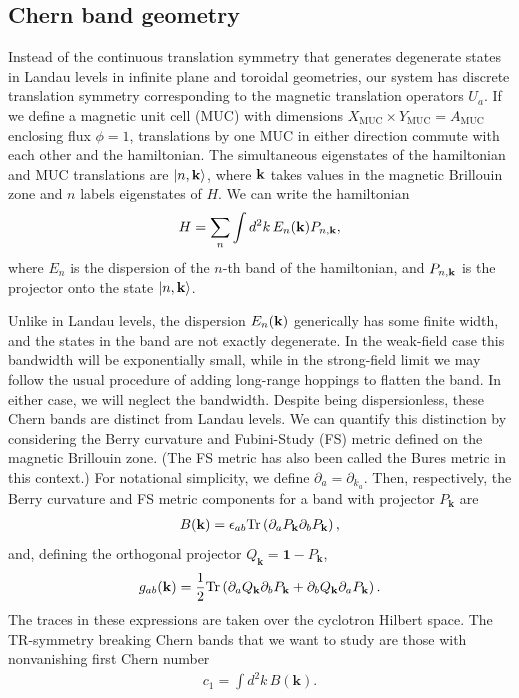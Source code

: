 \documentclass[aps,prb,twocolumn,letterpaper,twoside,nobalancelastpage,groupedaddress,amsmath,amssymb,floatfix,citeautoscript]{revtex4-1}
\begin{document}
\subsection{Chern band geometry}
Instead of the continuous translation symmetry that generates degenerate states in Landau levels in infinite plane and toroidal geometries, our system has discrete translation symmetry corresponding to the magnetic translation operators $U_a$. If we define a magnetic unit cell (MUC) with dimensions $X_{\text{MUC}} \times Y_{\text{MUC}} = A_{\text{MUC}}$ enclosing flux $\phi=1$, translations by one MUC in either direction commute with each other and the hamiltonian. The simultaneous eigenstates of the hamiltonian and MUC translations are $\ket{n,{\bf k}}$, where ${\bf k}$ takes values in the magnetic Brillouin zone and $n$ labels eigenstates of $H$. We can write the hamiltonian 
\begin{align}
\label{band-projector-ham}
H = \sum_{n}\int d^2k\, E_{n}({\bf k}) P_{n,{\bf k}},
\end{align}
where $E_n$ is the dispersion of the $n$-th band of the hamiltonian, and $P_{n,{\bf k}}$ is the projector onto the state $\ket{n,{\bf k}}$.

Unlike in Landau levels, the dispersion $E_{n}({\bf k})$ generically has some finite width, and the states in the band are not exactly degenerate. In the weak-field case this bandwidth will be exponentially small\cite{Harper:2014vi}, while in the strong-field limit we may follow the usual procedure of adding long-range hoppings to flatten the band. \cite{Bergholtz:2013ue,parameswaran_fractional_2013} In either case, we will neglect the bandwidth. Despite being dispersionless, these Chern bands are distinct from Landau levels. We can quantify this distinction by considering the Berry curvature and Fubini-Study (FS) metric defined on the magnetic Brillouin zone\cite{parameswaran_fractional_2013,roy_band_2014,Claassen2015}. (The FS metric has also been called the Bures metric in this context.\cite{palumbo_momentum-space_2017}) For notational simplicity, we define $\partial_a = \partial_{k_a}$. Then, respectively, the Berry curvature and FS metric components for a band with projector $P_{\mathbf{k}}$ are
\begin{align}
B({\bf k}) = \epsilon_{ab}\text{Tr}\left(\partial_{a}P_{\mathbf{k}}\partial_b P_{\mathbf{k}}\right),
\end{align}
and, defining the orthogonal projector $Q_{\mathbf{k}} = \mathbf{1} - P_{\mathbf{k}}$,
\begin{align}
g_{ab}({\bf k}) = \frac{1}{2}\text{Tr}\left(\partial_{a}Q_{\mathbf{k}}\partial_{b}P_{\mathbf{k}} + \partial_{b}Q_{\mathbf{k}}\partial_{a} P_{\mathbf{k}}\right). \\
\end{align}
The traces in these expressions are taken over the cyclotron Hilbert space. The TR-symmetry breaking Chern bands that we want to study are those with nonvanishing first Chern number 
\begin{align}
c_1 = \int d^2k\, B(\mathbf{k}).
\end{align}
\end{document}
